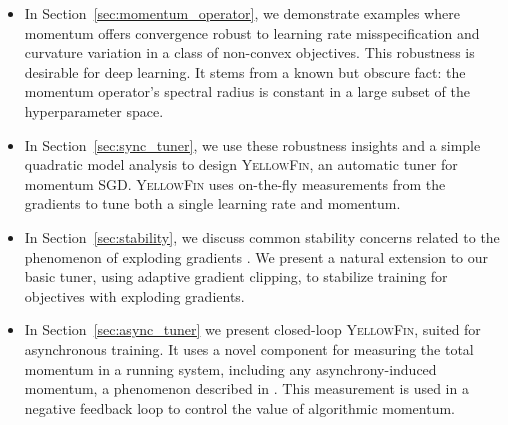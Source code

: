 \documentclass{article} %
\newcommand{\tuner}{\textsc{YellowFin}\xspace}
\newcommand{\asynctuner}{closed-loop \textsc{YellowFin}\xspace}
\begin{document}
\begin{itemize}[leftmargin=2em]
\setlength\itemsep{0.2em}
\item
In Section~\ref{sec:momentum_operator}, we demonstrate examples where momentum offers convergence robust to learning rate misspecification and curvature variation in a class of non-convex objectives.
This robustness is desirable for deep learning.
It stems from a known but obscure fact:
the momentum operator's spectral radius is constant in a large subset of the hyperparameter space.
\vspace{-1em}
\item
In Section~\ref{sec:sync_tuner}, we use these robustness insights and a simple quadratic model analysis to design \tuner, an automatic tuner for momentum SGD.
\tuner uses on-the-fly measurements from the gradients to tune both a single learning rate and momentum.
\item In Section~\ref{sec:stability}, we discuss common stability concerns related to the phenomenon of exploding gradients \citep{pascanu2013difficulty}.
We present a natural extension to our basic tuner, using adaptive gradient clipping, to stabilize training for objectives with exploding gradients.
\item In Section~\ref{sec:async_tuner} we present \asynctuner, suited for asynchronous training.
It uses a novel component for  measuring the total momentum in a running system, including any asynchrony-induced momentum, a phenomenon described in \cite{mitliagkas2016asynchrony}.
This measurement is used in a negative feedback loop to control the value of algorithmic momentum.%

\end{itemize}
\end{document}

